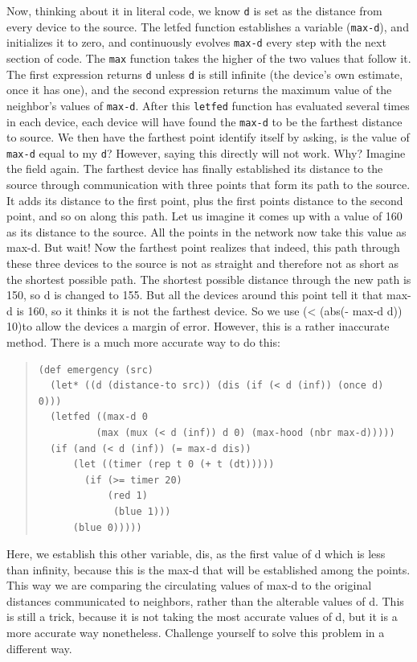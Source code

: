 \documentclass{article}
\newcommand\var[1]{{\tt #1}}
\begin{document}
{Now, thinking about it in literal code, we know \var{d} is set as the
distance from every device to the source.  The letfed function
establishes a variable (\var{max-d}), and initializes it to zero, and
continuously evolves \var{max-d} every step with the next section of
code.  The \var{max} function takes the higher of the two values that
follow it.  The first expression returns \var{d} unless \var{d} is
still infinite (the device's own estimate, once it has one), and the
second expression returns the maximum value of the neighbor's values
of \var{max-d}.  After this \var{letfed} function has evaluated
several times in each device, each device will have found the \var{max-d} to
be the farthest distance to source.  We then have the farthest point
identify itself by asking, is the value of \var{max-d} equal to my \var{d}?
However, saying this directly will not work.  Why?  Imagine the field
again. The farthest device has finally established its distance to the
source through communication with three points that form its path to
the source. It adds its distance to the first point, plus the first
points distance to the second point, and so on along this path. Let us 
imagine it comes up with a value of 160 as its distance to the source. All the
points in the network now take this value as max-d. But wait! Now the
farthest point realizes that indeed, this path through these three
devices to the source is not as straight and therefore not as short as
the shortest possible path. The shortest possible distance through the
new path is 150, so d is changed to 155. But all the devices around
this point tell it that max-d is 160, so it thinks it is not the
farthest device. So we use (< (abs(- max-d d)) 10)to allow the devices
a margin of error. However, this is a rather inaccurate method. There
is a much more accurate way to do this:

\begin{quote}
\begin{verbatim}
(def emergency (src) 
  (let* ((d (distance-to src)) (dis (if (< d (inf)) (once d) 0))) 
  (letfed ((max-d 0 
	      (max (mux (< d (inf)) d 0) (max-hood (nbr max-d))))) 
  (if (and (< d (inf)) (= max-d dis)) 
      (let ((timer (rep t 0 (+ t (dt))))) 			 
		(if (>= timer 20) 
		    (red 1) 
	         (blue 1))) 
      (blue 0)))))
\end{verbatim}
\end{quote}

Here, we establish this other variable, dis, as the first value of d
which is less than infinity, because this is the max-d that will be
established among the points. This way we are comparing the
circulating values of max-d to the original distances communicated to
neighbors, rather than the alterable values of d. This is still a
trick, because it is not taking the most accurate values of d, but it
is a more accurate way nonetheless. Challenge yourself to solve this
problem in a different way.

}
\end{document}
